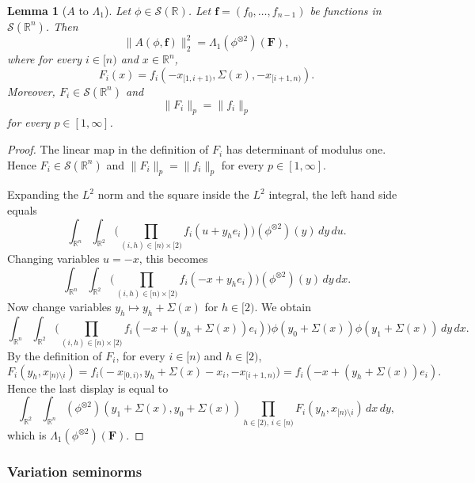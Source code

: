 \documentclass[12pt,reqno]{amsart}
\theoremstyle{plain}
\newtheorem{lemma}[theorem]{Lemma}
\numberwithin{equation}{section}
\theoremstyle{remark}
\newcommand{\uses}[1]{}
\newcommand{\usesdefs}[1]{}
\newcommand{\R}{{\mathbb R}}
\begin{document}
\begin{lemma}[$A$ to $\Lambda_1$]\label{A to Lambda}\uses{}\usesdefs{A_def,auto:prism-form-definition}
Let $\phi\in \mathcal{S}(\R)$.
Let $\mathbf{f}=(f_0,\dots,f_{n-1})$ be functions in $\mathcal{S}(\R^n)$.
Then
\begin{equation}\label{auto:twisted-average-prism-identity}
\|A(\phi, {\mathbf f})\|_2^2 = \Lambda_1(\phi^{\otimes 2})(\mathbf{F}),
\end{equation}
where for every $i\in[n)$ and $x\in\R^n$,
\begin{equation}\label{auto:twisted-average-coordinate-transform}
F_i(x)=f_i(-x_{[1,i+1)},\Sigma(x),-x_{[i+1,n)}).
\end{equation}
Moreover, $F_i\in\mathcal S(\R^n)$ and
\begin{equation}\label{auto:twisted-average-coordinate-transform-isometry}
\|F_i\|_p=\|f_i\|_p
\end{equation}
for every $p\in[1,\infty]$.
\end{lemma}

\begin{proof}
The linear map in the definition of $F_i$ has determinant of modulus one. Hence $F_i\in\mathcal S(\R^n)$ and $\|F_i\|_p=\|f_i\|_p$ for every $p\in[1,\infty]$.

Expanding the $L^2$ norm and the square inside the $L^2$ integral, the left hand side equals
\[
 \int_{\R^n} \int_{\mathbb{R}^2}
 \Big(\prod_{(i,h)\in [n)\times [2)} f_i(u+y_h e_i) \Big)
 (\phi^{\otimes 2})(y)\, dy\, du .
\]
Changing variables $u=-x$, this becomes
\[
 \int_{\R^n} \int_{\mathbb{R}^2}
 \Big(\prod_{(i,h)\in [n)\times [2)} f_i(-x+y_h e_i) \Big)
 (\phi^{\otimes 2})(y)\, dy\, dx .
\]
Now change variables $y_h\mapsto y_h+\Sigma(x)$ for $h\in[2)$. We obtain
\[
 \int_{\R^n} \int_{\mathbb{R}^2}
 \Big(\prod_{(i,h)\in [n)\times [2)}
 f_i(-x+(y_h+\Sigma(x))e_i) \Big)
 \phi(y_0+\Sigma(x))\phi(y_1+\Sigma(x))\, dy\, dx .
\]
By the definition of $F_i$, for every $i\in[n)$ and $h\in[2)$,
\[
 F_i(y_h,x_{[n)\setminus i})
 =
 f_i\bigl(-x_{[0,i)},y_h+\Sigma(x)-x_i,-x_{[i+1,n)}\bigr)
 =
 f_i(-x+(y_h+\Sigma(x))e_i).
\]
Hence the last display is equal to
\[
 \int_{\R^2}\int_{\R^n}
 (\phi^{\otimes 2})(y_1+\Sigma(x),y_0+\Sigma(x))
 \prod_{h\in[2),\,i\in[n)}
 F_i(y_h,x_{[n)\setminus i})\,dx\,dy ,
\]
which is $\Lambda_1(\phi^{\otimes 2})(\mathbf{F})$.
\end{proof}


\subsubsection{Variation seminorms}\label{sec:variation-norm}
\end{document}

